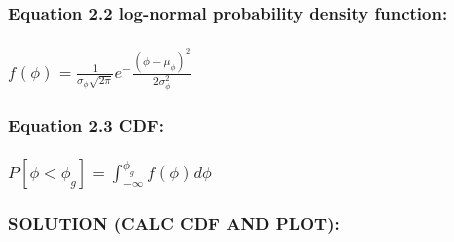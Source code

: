 \documentclass[11pt]{article}
\begin{document}
\hypertarget{equation-2.2-log-normal-probability-density-function}{%
\subsubsection{Equation 2.2 log-normal probability density
function:}\label{equation-2.2-log-normal-probability-density-function}}

\hypertarget{fphi-frac1sigma_phi-sqrt2pie-fracphi-mu_phi22sigma_phi2}{%
\subsubsection{\texorpdfstring{\(f(\phi) = \frac{1}{\sigma_\phi \sqrt{2\pi}}e^-{\frac{{(\phi-\mu_\phi)}^2}{2\sigma_\phi^2}}\)}{f(\textbackslash{}phi) = \textbackslash{}frac\{1\}\{\textbackslash{}sigma\_\textbackslash{}phi \textbackslash{}sqrt\{2\textbackslash{}pi\}\}e\^{}-\{\textbackslash{}frac\{\{(\textbackslash{}phi-\textbackslash{}mu\_\textbackslash{}phi)\}\^{}2\}\{2\textbackslash{}sigma\_\textbackslash{}phi\^{}2\}\}}}\label{fphi-frac1sigma_phi-sqrt2pie-fracphi-mu_phi22sigma_phi2}}

\hypertarget{equation-2.3-cdf}{%
\subsubsection{Equation 2.3 CDF:}\label{equation-2.3-cdf}}

\hypertarget{pphi-phi_g-int_-inftyphi_g-fphidphi}{%
\subsubsection{\texorpdfstring{\(P[\phi < \phi_g] = \int_{-\infty}^{\phi_g} f(\phi)d\phi\)}{P{[}\textbackslash{}phi \textless{} \textbackslash{}phi\_g{]} = \textbackslash{}int\_\{-\textbackslash{}infty\}\^{}\{\textbackslash{}phi\_g\} f(\textbackslash{}phi)d\textbackslash{}phi}}\label{pphi-phi_g-int_-inftyphi_g-fphidphi}}

    \hypertarget{solution-calc-cdf-and-plot}{%
\subsubsection{\texorpdfstring{{\textbf{SOLUTION (CALC CDF AND
PLOT):}}}{SOLUTION (CALC CDF AND PLOT):}}\label{solution-calc-cdf-and-plot}}
\end{document}
